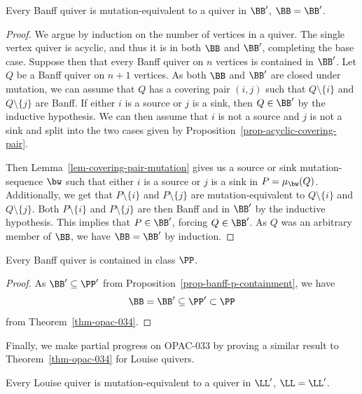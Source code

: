 \begin{thm}[OPAC-034] \label{thm-opac-034}
    Every Banff quiver is mutation-equivalent to a quiver in $\BB'$, \ie $\BB = \BB'$.
\end{thm}

\begin{proof}
    We argue by induction on the number of vertices in a quiver.
    The single vertex quiver is acyclic, and thus it is in both $\BB$ and $\BB'$, completing the base case.
    Suppose then that every Banff quiver on $n$ vertices is contained in $\BB'$.
    Let $Q$ be a Banff quiver on $n+1$ vertices.
    As both $\BB$ and $\BB'$ are closed under mutation, we can assume that $Q$ has a covering pair $(i,j)$ such that $Q \setminus \{i\}$ and $Q \setminus \{j\}$ are Banff.
    If either $i$ is a source or $j$ is a sink, then $Q \in \BB'$ by the inductive hypothesis.
    We can then assume that $i$ is not a source and $j$ is not a sink and split into the two cases given by Proposition~\ref{prop-acyclic-covering-pair}.

    Then Lemma~\ref{lem-covering-pair-mutation} gives us a source or sink mutation-sequence $\bw$ such that either $i$ is a source or $j$ is a sink in $P = \mu_\bw(Q)$.
    Additionally, we get that $P \setminus \{i\}$ and $P \setminus \{j\}$ are mutation-equivalent to $Q \setminus \{i\}$ and $Q \setminus \{j\}$.
    Both $P \setminus \{i\}$ and $P \setminus \{j\}$ are then Banff and in $\BB'$ by the inductive hypothesis.
    This implies that $P \in \BB'$, forcing $Q \in \BB'$.
    As $Q$ was an arbitrary member of $\BB$, we have $\BB = \BB'$ by induction.
\end{proof}

\begin{coro}[OPAC-035] \label{cor-opac-035}
    Every Banff quiver is contained in class $\PP$.
\end{coro}

\begin{proof}
    As $\BB' \subseteq \PP'$ from Proposition~\ref{prop-banff-p-containment},  we have
    $$\BB = \BB' \subseteq \PP' \subset \PP$$
    from Theorem~\ref{thm-opac-034}.
\end{proof}

Finally, we make partial progress on OPAC-033 by proving a similar result to Theorem~\ref{thm-opac-034} for Louise quivers.

\begin{coro} \label{cor-louise-louise-prime}
    Every Louise quiver is mutation-equivalent to a quiver in $\LL'$, \ie $\LL= \LL'$.
\end{coro}


